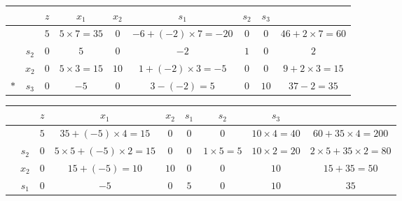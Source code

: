 \documentclass[a4paper,12pt]{article}
\begin{document}
\begin{table}[H]
    \tiny
    \begin{tabularx}{\textwidth}{cc|cccccc|c}
            &       & $z$ & $x_1$             & $x_2$ & $s_1$                      & $s_2$ & $s_3$ &                        \\
        \hline
            &       & $5$ & $5 \times 7 = 35$ & $0$   & $-6 + (-2) \times 7 = -20$ & $0$   & $0$   & $46 + 2 \times 7 = 60$ \\
        \hline
            & $s_2$ & $0$ & $5$               & $0$   & $-2$                       & $1$   & $0$   & $2$                    \\
            & $x_2$ & $0$ & $5 \times 3 = 15$ & $10$  & $1 + (-2) \times 3 = -5$   & $0$   & $0$   & $9 + 2 \times 3 = 15$  \\
        $*$ & $s_3$ & $0$ & $-5$              & $0$   & $3 - (-2) = 5$             & $0$   & $10$  & $37 - 2 = 35$          \\
    \end{tabularx}
\end{table}

\begin{table}[H]
    \tiny
    \begin{tabularx}{\textwidth}{cc|cccccc|c}
         &       & $z$ & $x_1$                             & $x_2$ & $s_1$ & $s_2$            & $s_3$              &                                 \\
        \hline
         &       & $5$ & $35 + (-5) \times 4 = 15$         & $0$   & $0$   & $0$              & $10 \times 4 = 40$ & $60 + 35 \times 4 = 200$        \\
        \hline
         & $s_2$ & $0$ & $5 \times 5 + (-5) \times 2 = 15$ & $0$   & $0$   & $1 \times 5 = 5$ & $10 \times 2 = 20$ & $2 \times 5 + 35 \times 2 = 80$ \\
         & $x_2$ & $0$ & $15 + (-5) = 10$                  & $10$  & $0$   & $0$              & $10$               & $15 + 35 = 50$                  \\
         & $s_1$ & $0$ & $-5$                              & $0$   & $5$   & $0$              & $10$               & $35$                            \\
    \end{tabularx}
\end{table}
\end{document}
